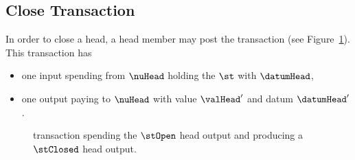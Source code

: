\subsection{Close Transaction}\label{sec:close-tx}

In order to close a head, a head member may post the \mtxClose{} transaction
(see Figure~\ref{fig:closeTx}). This transaction has
\begin{itemize}
  \item one input spending from $\nuHead$ holding the $\st$ with $\datumHead$,
  \item one output paying to $\nuHead$ with value $\valHead'$ and
  datum $\datumHead'$.
\end{itemize}

\begin{figure}
  \centering
  
  \caption{\mtxClose{} transaction spending the $\stOpen$ head output and producing a $\stClosed$ head output.}\label{fig:closeTx}
\end{figure}

